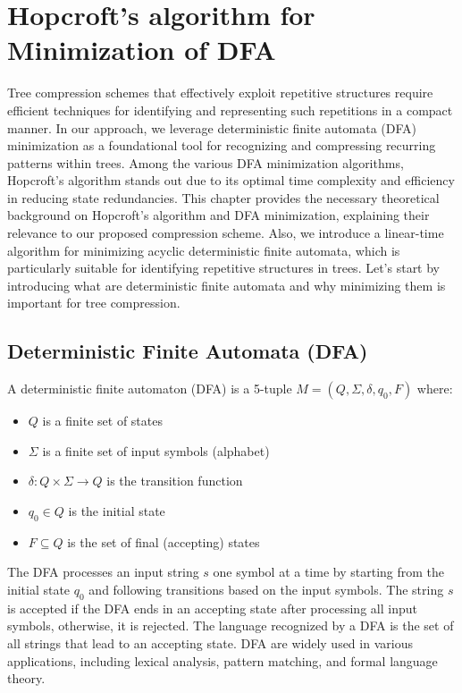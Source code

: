 \chapter{Hopcroft's algorithm for Minimization of DFA} \label{chp:hopcroft}

Tree compression schemes that effectively exploit repetitive structures require efficient techniques for identifying and representing such repetitions in a compact manner. In our approach, we leverage deterministic finite automata (DFA) minimization as a foundational tool for recognizing and compressing recurring patterns within trees. Among the various DFA minimization algorithms, Hopcroft's algorithm stands out due to its optimal time complexity and efficiency in reducing state redundancies. This chapter provides the necessary theoretical background on Hopcroft's algorithm and DFA minimization, explaining their relevance to our proposed compression scheme. Also, we introduce a linear-time algorithm for minimizing acyclic deterministic finite automata, which is particularly suitable for identifying repetitive structures in trees. Let's start by introducing what are deterministic finite automata and why minimizing them is important for tree compression.

\section{Deterministic Finite Automata (DFA)}
\begin{definition} \label{def:dfa}
    A deterministic finite automaton (DFA) is a 5-tuple $M = (Q, \Sigma, \delta, q_0, F)$ where:
    \begin{itemize}
        \item $Q$ is a finite set of states
        \item $\Sigma$ is a finite set of input symbols (alphabet)
        \item $\delta: Q \times \Sigma \rightarrow Q$ is the transition function
        \item $q_0 \in Q$ is the initial state
        \item $F \subseteq Q$ is the set of final (accepting) states
    \end{itemize}
\end{definition}

The DFA processes an input string $s$ one symbol at a time by starting from the initial state $q_0$ and following transitions based on the input symbols. The string $s$ is accepted if the DFA ends in an accepting state after processing all input symbols, otherwise, it is rejected. The language recognized by a DFA is the set of all strings that lead to an accepting state. DFA are widely used in various applications, including lexical analysis, pattern matching, and formal language theory. 

